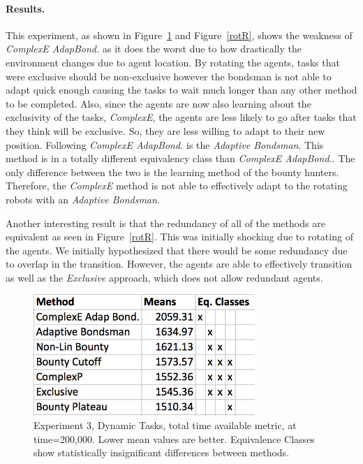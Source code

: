 \documentclass[letterpaper]{aamas2015}
\newcommand\paragrapha[1]{\paragraph*{{#1}.}}
\newcommand\bump{\vspace{10in}}
\begin{document}
\paragrapha{Results}
This experiment, as shown in Figure~\ref{rotT} and Figure~\ref{rotR}, shows the weakness of \textit{ComplexE AdapBond.} as it does the worst due to how drastically the environment changes due to agent location.  By rotating the agents, tasks that were exclusive should be non-exclusive however the bondsman is not able to adapt quick enough causing the tasks to wait much longer than any other method to be completed. Also, since the agents are now also learning about the exclusivity of the tasks, \textit{ComplexE}, the agents are less likely to go after tasks that they think will be exclusive.  So, they are less willing to adapt to their new position. Following \textit{ComplexE AdapBond.} is the \textit{Adaptive Bondsman}.  This method is in a totally different equivalency class than \textit{ComplexE AdapBond.}.  The only difference between the two is the learning method of the bounty hunters.  Therefore, the \textit{ComplexE} method is not able to effectively adapt to the rotating robots with an \textit{Adaptive Bondsman}.

Another interesting result is that the redundancy of all of the methods are equivalent as seen in Figure~\ref{rotR}.  This was initially shocking due to rotating of the agents.  We initially hypothesized that there would be some redundancy due to overlap in the transition.  However, the agents are able to effectively transition as well as the \textit{Exclusive} approach, which does not allow redundant agents.



\begin{figure}[t]
\begin{center}\includegraphics[width=3.3in]{rotT.png}\end{center}
\vspace{-0.5em}\caption{Experiment 3, Dynamic Tasks, total time available metric, at time=200,000.  Lower mean values are better.  Equivalence Classes show statistically insignificant differences between methods.}
\label{rotT}
\end{figure}
\end{document}
